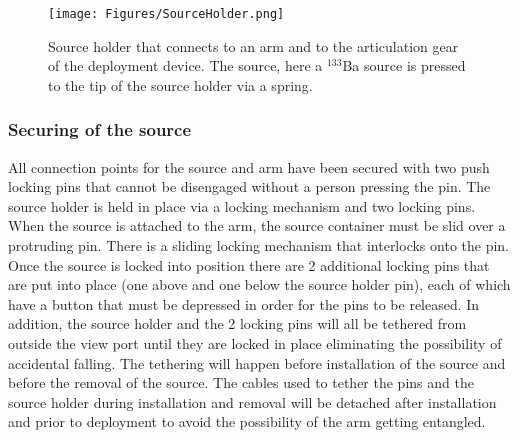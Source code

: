 \begin{figure}[htbp]
 \centering
  \texttt{[image: Figures/SourceHolder.png]}
  \caption{Source holder that connects to an arm and to the articulation gear of the deployment device. The source, here a $^{133}$Ba source is pressed to the tip of the source holder via a spring.}
  \label{fig:SourceHolder}
\end{figure}


\subsubsection{Securing of the source}
All connection points for the source and arm have been secured with two push locking pins that cannot be disengaged without a person pressing the pin. 
The source holder is held in place via a locking mechanism and two locking pins. When the source is attached to the arm, the source container must be slid over a protruding pin. There is a sliding locking mechanism that interlocks onto the pin. Once the source is locked into position there are 2 additional locking pins that are put into place (one above and one below the source holder pin), each of which have a button that must be depressed in order for the pins to be released. In addition, the source holder and the 2 locking pins will all be tethered from outside the view port until they are locked in place eliminating the possibility of accidental falling.  The tethering will happen before installation of the source and before the removal of the source. The cables used to tether the pins and the source holder during installation and removal will be detached after installation and prior to deployment to avoid the possibility of the arm getting entangled.  
 

